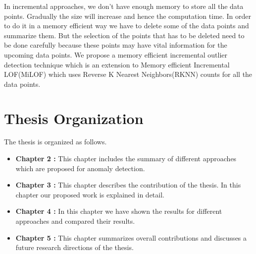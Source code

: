 \par
In incremental approaches, we don't have enough memory to store all the data points. Gradually the size will increase and hence the computation time. In order to do it in a memory efficient way we have to delete some of the data points and summarize them. But the selection of the points that has to be deleted need to be done carefully because these points may have vital information for the upcoming data points. We propose a memory efficient incremental outlier detection technique which is an extension to Memory efficient Incremental LOF(MiLOF) which uses Reverse K Nearest Neighbors(RKNN) counts for all the data points.

\section{Thesis Organization}

The thesis is organized as follows.

\begin{itemize}
	
\item  \textbf{Chapter 2 :} This chapter includes the summary of different approaches which are proposed for anomaly detection.

\item  \textbf{Chapter 3 :} This chapter describes the contribution of the thesis. In this chapter our proposed work is explained in detail. 


\item  \textbf{Chapter 4 :} In this chapter we have shown the results for different approaches and compared their results.


\item \textbf{Chapter 5 :} This chapter summarizes overall contributions and discusses a future research
directions of the thesis.

 


\end{itemize}
	




